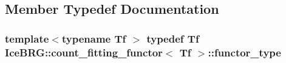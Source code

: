\subsection{Member Typedef Documentation}
\hypertarget{classIceBRG_1_1count__fitting__functor_a681f2697a3ad0a5aa13882f0fba0e170}{
\subsubsection[{functor\-\_\-type}]{\setlength{\rightskip}{0pt plus 5cm}template$<$typename Tf $>$ typedef Tf {\bf Ice\-B\-R\-G\-::count\-\_\-fitting\-\_\-functor}$<$ Tf $>$\-::{\bf functor\-\_\-type}}}\label{classIceBRG_1_1count__fitting__functor_a681f2697a3ad0a5aa13882f0fba0e170}


